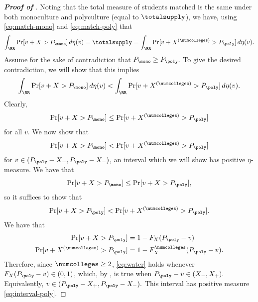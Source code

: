 \documentclass[10pt]{article}
\begin{document}
\begin{ReviewVerbatim}
\begin{proof}[\textbf{Proof of }]
    Noting that the total measure of students matched is the same under both monoculture and polyculture (equal to $\totalsupply$), we have, using \eqref{eq:match-mono} and \eqref{eq:match-poly} that
    \begin{equation}
        \int_{\RR} \Pr[v + X > P_{\mono}]\,d\eta(v) = \totalsupply = \int_{\RR} \Pr[v + X^{(\numcolleges)} > P_{\poly}]\,d\eta(v).
    \end{equation}
    Assume for the sake of contradiction that $P_{\mono}\ge P_{\poly}.$ To give the desired contradiction, we will show that this implies
    \begin{equation}
        \int_{\RR} \Pr[v + X > P_{\mono}]\,d\eta(v) < \int_{\RR} \Pr[v + X^{(\numcolleges)} > P_{\poly}]\,d\eta(v).
    \end{equation}
    Clearly,
    \begin{equation}
        \Pr[v + X > P_{\mono}] \le \Pr[v + X^{(\numcolleges)} > P_{\poly}]
    \end{equation}
    for all $v$. We now show that
    \begin{equation}
        \Pr[v + X > P_{\mono}] < \Pr[v + X^{(\numcolleges)} > P_{\poly}]
    \end{equation}
    for $v\in (P_{\poly}-X_+, P_{\poly}-X_-)$, an interval which we will show has positive $\eta$-measure. We have that
    \begin{equation}
        \Pr[v + X > P_{\mono}] \le \Pr[v + X > P_{\poly}],
    \end{equation}
    so it suffices to show that
    \begin{equation}\label{eq:water}
        \Pr[v + X > P_{\poly}] < \Pr[v + X^{(\numcolleges)} > P_{\poly}].
    \end{equation}
    We have that
    \begin{align}
        \Pr[v + X > P_{\poly}] &= 1 - F_X(P_{\poly} - v)\\
        \Pr[v + X^{(\numcolleges)} > P_{\poly}] &= 1 - F_X^\numcolleges(P_{\poly} - v).
    \end{align}
    Therefore, since $\numcolleges\ge 2$, \eqref{eq:water} holds whenever $F_X(P_{\poly} - v)\in (0,1)$, which, by , is true when $P_{\poly} - v \in (X_-, X_+).$ Equivalently, $v \in (P_{\poly} - X_+, P_{\poly} - X_-).$ This interval has positive measure \eqref{eq:interval-poly}.
\end{proof}
\end{ReviewVerbatim}
\end{document}
